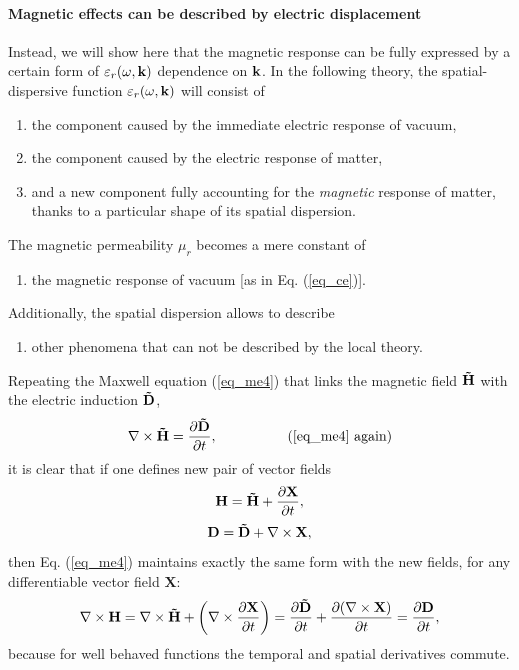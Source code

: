 
\paragraph{Magnetic effects can be described by electric displacement}%
Instead, we will show here that the magnetic response can be fully expressed by a certain form of $\varepsilon_r(\omega, {\mathbf{k}})$ dependence on ${\mathbf{k}}$. In the following theory, the spatial-dispersive function $\varepsilon_r(\omega, {\mathbf{k}})$ will consist of
\begin{enumerate}
 \item{the component caused by the immediate electric response of vacuum,} 
 \item{the component caused by the electric response of matter,}
 \item{and a new component fully accounting for the \textit{magnetic} response of matter, thanks to a particular shape of its spatial dispersion.}
\end{enumerate}
The magnetic permeability $\mu_r$ becomes a mere constant of
\begin{enumerate}[resume]
 \item{the magnetic response of vacuum [as in Eq. (\ref{eq_ce})].} 
\end{enumerate}
Additionally, the spatial dispersion allows to describe
\begin{enumerate}[resume]
 \item{other phenomena that can not be described by the local theory.} 
\end{enumerate}
Repeating the Maxwell equation (\ref{eq_me4}) that links the magnetic field $\mathbf{\tilde{H}}$ with the electric induction $\mathbf{\tilde{D}}$, 
$$ \nabla \times \mathbf{\tilde{H}} =  \frac{\partial \mathbf{\tilde{D}}} {\partial t},\quad\quad\quad\quad\quad\text{(\ref{eq_me4} again)}$$
it is clear that if one defines new pair of vector fields
\begin{equation} \mathbf{H} = \mathbf{\tilde{H}} + \frac{\partial\mathbf{X}}{\partial t}, \label{eq_HHsd}\end{equation}
\begin{equation} \mathbf{D}  = \mathbf{\tilde{D}}  + \nabla\times \mathbf{X}, \label{eq_Dsd}\end{equation}
then Eq. (\ref{eq_me4}) maintains exactly the same form with the new fields, for any differentiable vector field $\mathbf{X}$:
\begin{equation} \nabla \times \mathbf{H} = \nabla \times \mathbf{\tilde{H}} + \left(\nabla\times \frac{\partial\mathbf{X}}{\partial t}\right) = \frac{\partial \mathbf{\tilde{D}}}{\partial t}+ \frac{\partial(\nabla\times \mathbf{X})}{\partial t} =  \frac{\partial \mathbf{D}} {\partial t}, \label{eq_me4sd} \end{equation}
because for well behaved functions the temporal and spatial derivatives commute.

